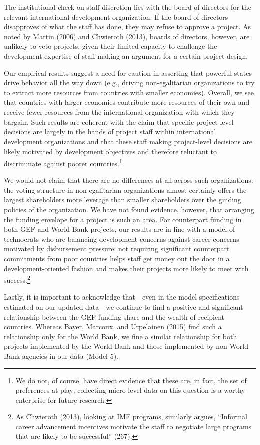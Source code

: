 \documentclass{article}
\begin{document}
The institutional check on staff discretion lies with the board of directors for the relevant international development organization.  If the board of directors disapproves of what the staff has done, they may refuse to approve a project.  As noted by Martin (2006) and Chwieroth (2013), boards of directors, however, are unlikely to veto projects, given their limited capacity to challenge the development expertise of staff making an argument for a certain project design.

Our empirical results suggest a need for caution in asserting that powerful states drive behavior all the way down (e.g., driving non-egalitarian organizations to try to extract more resources from countries with smaller economies). Overall, we see that countries with larger economies contribute more resources of their own and receive fewer resources from the international organization with which they bargain.  Such results are coherent with the claim that specific project-level decisions are largely in the hands of project staff within international development organizations and that these staff making project-level decisions are likely motivated by development objectives and therefore reluctant to discriminate against poorer countries.\footnote{We do not, of course, have direct evidence that these are, in fact, the set of preferences at play; collecting micro-level data on this question is a worthy enterprise for future research.}   

We would not claim that there are no differences at all across such organizations: the voting structure in non-egalitarian organizations almost certainly offers the largest shareholders more leverage than smaller shareholders over the guiding policies of the organization.  We have not found evidence, however, that arranging the funding envelope for a project is such an area.  For counterpart funding in both GEF and World Bank projects, our results are in line with a model of technocrats who are balancing development concerns against career concerns motivated by disbursement pressure: not requiring significant counterpart commitments from poor countries helps staff get money out the door in a development-oriented fashion and makes their projects more likely to meet with success.\footnote{As Chwieroth (2013), looking at IMF programs, similarly argues, “Informal career advancement incentives motivate the staff to negotiate large programs that are likely to be successful” (267).} 
  
Lastly, it is important to acknowledge that––even in the model specifications estimated on our updated data––we continue to find a positive and significant relationship between the GEF funding share and the wealth of recipient countries.  Whereas Bayer, Marcoux, and Urpelainen (2015) find such a relationship only for the World Bank, we fine a similar relationship for both projects implemented by the World Bank and those implemented by non-World Bank agencies in our data (Model 5).  
\end{document}

